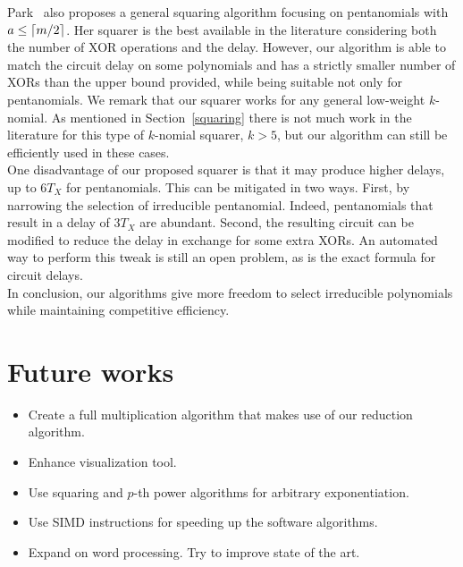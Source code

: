 Park~\cite{park2012explicit} also proposes a general squaring algorithm focusing on pentanomials with $a \leq \lceil m/2\rceil$. Her squarer is the best available in the literature considering both the number of XOR operations and the delay. However, our algorithm is able to match the circuit delay on some polynomials and has a strictly smaller number of XORs than the upper bound provided, while being suitable not only for pentanomials. 
We remark that our squarer works for any general low-weight $k$-nomial. As mentioned in Section~\ref{squaring} there is not much work in the literature for this type of $k$-nomial squarer, $k>5$, but our algorithm can still be efficiently used in these cases.\\

One disadvantage of our proposed squarer is that it may produce higher delays, up to $6 T_X$ for pentanomials. This can be mitigated in two ways. First, by narrowing the selection of irreducible pentanomial. Indeed,  pentanomials that result in a delay of $3 T_X$ are abundant. Second, the resulting circuit can be modified to reduce the delay in exchange for some extra XORs. An automated way to perform this tweak is still an open problem, as is the exact formula for circuit delays.\\

In conclusion, our algorithms give more freedom to select irreducible polynomials while maintaining competitive efficiency.

\section{Future works}

\begin{itemize}
	\item Create a full multiplication algorithm that makes use of our reduction algorithm.
	\item Enhance visualization tool.
	\item Use squaring and $p$-th power algorithms for arbitrary exponentiation.
	\item Use SIMD instructions for speeding up the software algorithms.
	\item Expand on word processing. Try to improve state of the art.
\end{itemize}
